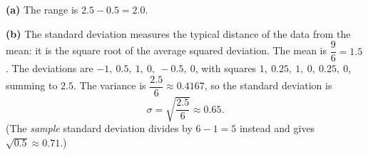 \textbf{(a)} The range is $2.5-0.5=\boxed{2.0}$.

\textbf{(b)} The standard deviation measures the typical distance of the data from the mean: it is the square root of the average squared deviation. The mean is $\dfrac{9}{6}=1.5$. The deviations are $-1,\ 0.5,\ 1,\ 0,\ -0.5,\ 0$, with squares $1,\ 0.25,\ 1,\ 0,\ 0.25,\ 0$, summing to $2.5$. The variance is $\dfrac{2.5}{6}\approx0.4167$, so the standard deviation is
\[\sigma=\sqrt{\dfrac{2.5}{6}}\approx\boxed{0.65}.\]
(The \emph{sample} standard deviation divides by $6-1=5$ instead and gives $\sqrt{0.5}\approx0.71$.)
